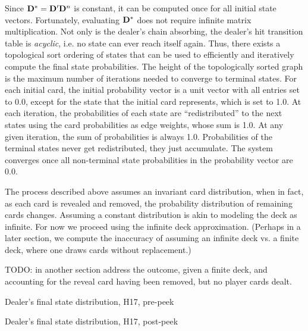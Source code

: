 
Since $\mathbf{D^*}=\mathbf{D^\prime}\mathbf{D}^n$ is constant, it can be computed once
for all initial state vectors.
Fortunately, evaluating $\mathbf{D^*}$ does not require infinite 
matrix multiplication.
Not only is the dealer's chain absorbing, 
the dealer's hit transition table is \emph{acyclic}, i.e. 
no state can ever reach itself again.  
Thus, there exists a topological sort
ordering of states that can be used to efficiently and iteratively 
compute the final state probabilities.
The height of the topologically sorted graph is the maximum 
number of iterations needed to converge to terminal states.
For each initial card, the initial probability vector
is a unit vector with all entries set to 0.0, except for the state
that the initial card represents, which is set to 1.0.
At each iteration, the probabilities of each state are 
``redistributed'' to the next states using the 
card probabilities as edge weights, whose sum is 1.0.  
At any given iteration, the sum of probabilities is always 1.0.
Probabilities of the terminal states never get redistributed, 
they just accumulate.  
The system converges once all non-terminal state probabilities 
in the probability vector are 0.0.

The process described above assumes an invariant
card distribution, when in fact, as each card is revealed and removed, 
the probability distribution of remaining cards changes.
Assuming a constant distribution is akin to modeling
the deck as infinite.
For now we proceed using the infinite deck approximation.  
(Perhaps in a later section, we compute the inaccuracy of
assuming an infinite deck vs. a finite deck, where one 
draws cards without replacement.)

TODO: in another section address the outcome, given a finite deck,
and accounting for the reveal card having been removed, 
but no player cards dealt.


\begin{table}[ht!]
\caption{Dealer's final state distribution, H17, pre-peek}
\begin{center}

\end{center}
\label{tab:dealer-final-H17-pre-peek}
\end{table}

\begin{table}[ht!]
\caption{Dealer's final state distribution, H17, post-peek}
\begin{center}

\end{center}
\label{tab:dealer-final-H17-post-peek}
\end{table}


